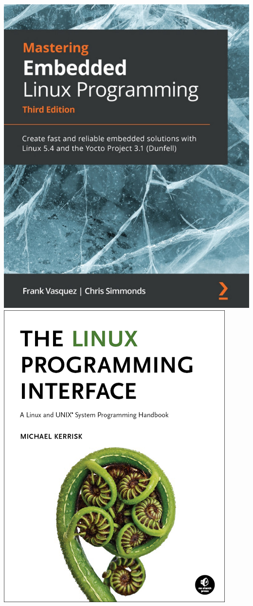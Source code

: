 \begin{frame}
\begin{columns}
    \includegraphics[height=0.25\textheight]{slides/sysdev-references/book-mastering-embedded-linux3.jpg}\\
    \vspace{0.5cm}
    \includegraphics[height=0.25\textheight]{common/linux-programming-interface.png}\\

\end{columns}
\end{frame}
